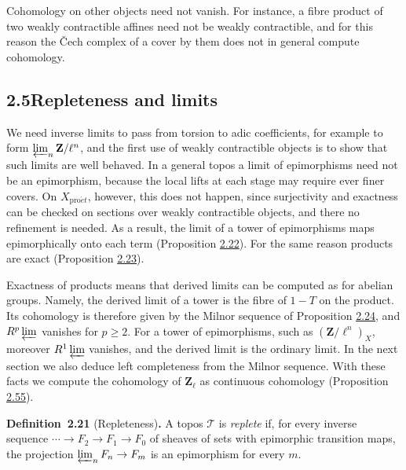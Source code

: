 \documentclass[11pt]{article}
\newenvironment{bpstatement}[2]{\par\addvspace{0.6\baselineskip}\noindent\textbf{#1}#2\textbf{.}\enspace\ignorespaces}
  {\par\addvspace{0.4\baselineskip}}
\begin{document}
Cohomology on other objects need not vanish. For instance, a fibre product of two weakly contractible affines need not be weakly contractible, and for this reason the Čech complex of a cover by them does not in general compute cohomology.


\subsection*{\texorpdfstring{2.5\quad Repleteness and limits}{2.5 Repleteness and limits}}
\label{bp60}%
\label{bp61}%
We need inverse limits to pass from torsion to adic coefficients, for example to form \(\varprojlim_n\mathbf Z/\ell^n\), and the first use of weakly contractible objects is to show that such limits are well behaved. In a general topos a limit of epimorphisms need not be an epimorphism, because the local lifts at each stage may require ever finer covers. On \(X_{\mathrm{pro}\acute{e}t}\), however, this does not happen, since surjectivity and exactness can be checked on sections over weakly contractible objects, and there no refinement is needed. As a result, the limit of a tower of epimorphisms maps epimorphically onto each term (Proposition \hyperref[bp63]{2.22}). For the same reason products are exact (Proposition \hyperref[bp66]{2.23}).

Exactness of products means that derived limits can be computed as for abelian groups. Namely, the derived limit of a tower is the fibre of \(1-T\) on the product. Its cohomology is therefore given by the Milnor sequence of Proposition \hyperref[bp69]{2.24}, and \(R^p\varprojlim\) vanishes for \(p\geq2\). For a tower of epimorphisms, such as \((\mathbf Z/\ell^n)_X\), moreover \(R^1\varprojlim\) vanishes, and the derived limit is the ordinary limit. In the next section we also deduce left completeness from the Milnor sequence. With these facts we compute the cohomology of \(\mathbf Z_\ell\) as continuous cohomology (Proposition \hyperref[bp170]{2.55}).

\label{bp62}%
\begin{bpstatement}{Definition~2.21}{ (Repleteness)}
A topos \(\mathcal T\) is \emph{replete} if, for every inverse sequence \(\cdots\to F_2\to F_1\to F_0\) of sheaves of sets with epimorphic transition maps, the projection \(\varprojlim_nF_n\to F_m\) is an epimorphism for every \(m\).
\end{bpstatement}
\end{document}
